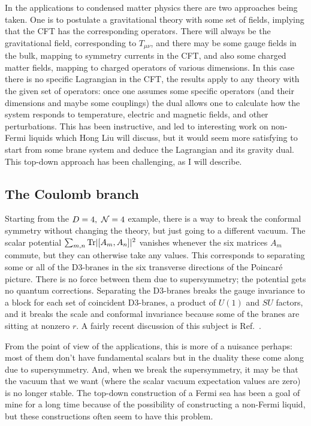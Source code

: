 \documentclass[12pt]{article}
\begin{document}
{In the applications to condensed matter physics there are two approaches being taken.  One is to postulate a gravitational theory with some set of fields, implying that the CFT has the corresponding operators.  There will always be the gravitational field, corresponding to $T_{\mu\nu}$, and there may be some gauge fields in the bulk, mapping to symmetry currents in the CFT, and also some charged matter fields, mapping to charged operators of various dimensions.  In this case there is no specific Lagrangian in the CFT, the results apply to any theory with the given set of operators: once one assumes some specific operators (and their dimensions and maybe some couplings) the dual allows one to calculate how the system responds to temperature, electric and magnetic fields, and other perturbations.  This has been instructive, and led to interesting work on non-Fermi liquids which Hong Liu will discuss, but it would seem more satisfying to start from some brane system and deduce the Lagrangian and its gravity dual.  This top-down approach has been challenging, as I will describe.

\subsection{The Coulomb branch}

Starting from the $D=4,\ {\cal N}=4$ example, there is a way to break the conformal symmetry without changing the theory, but just going to a different vacuum.  The scalar potential $\sum_{m,n}  {\rm Tr}|[A_m,A_n]|^2$ vanishes whenever the six matrices $A_m$ commute, but they can otherwise take any values.  This corresponds to separating some or all of the 
D3-branes in the six transverse directions of the Poincar\'e picture.  There is no force between them due to supersymmetry; the potential gets no quantum corrections.  Separating the D3-branes breaks the gauge invariance to a block for each set of coincident D3-branes, a product of $U(1)$ and $SU$ factors, and it breaks the scale and conformal invariance because some of the branes are sitting at nonzero $r$.  A fairly recent discussion of this subject is Ref.~\cite{Skenderis:2006di}.
 
From the point of view of the applications, this is more of a nuisance perhaps: most of them don't have fundamental scalars but in the duality these come along due to supersymmetry.  And, when we break the supersymmetry, it may be that the vacuum that we want (where the scalar vacuum expectation values are zero) is no longer stable.  The top-down construction of a Fermi sea has been a goal of mine for a long time because of the possibility of constructing a non-Fermi liquid, but these constructions often seem to have this problem.

}
\end{document}
